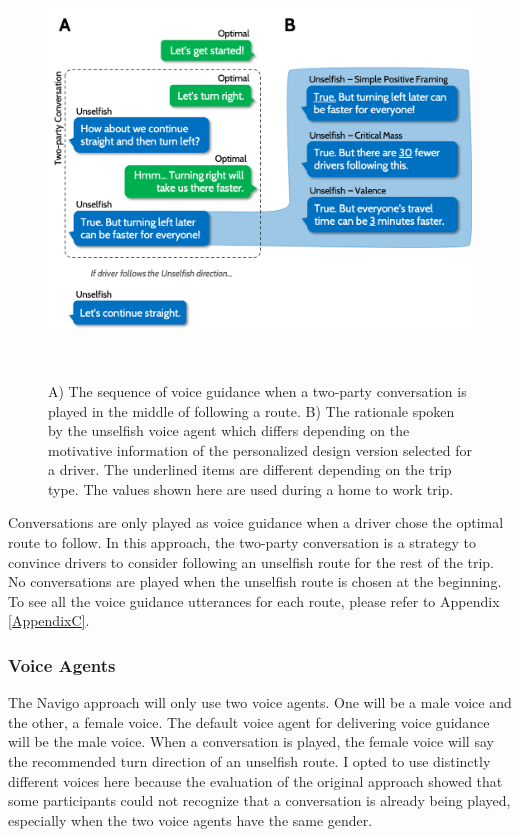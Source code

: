 \begin{figure}[h]
\centering
  \includegraphics[scale=.75]{figures/s4-twopartyconvo.png}
  \caption{A) The sequence of voice guidance when a two-party conversation is played in the middle of following a route. B) The rationale spoken by the unselfish voice agent which differs depending on the motivative information of the personalized design version selected for a driver. The underlined items are different depending on the trip type. The values shown here are used during a home to work trip.}~\label{fig:s4-twopartyconvo}
\end{figure}

Conversations are only played as voice guidance when a driver chose the optimal route to follow. In this approach, the two-party conversation is a strategy to convince drivers to consider following an unselfish route for the rest of the trip. No conversations are played when the unselfish route is chosen at the beginning. To see all the voice guidance utterances for each route, please refer to Appendix \ref{AppendixC}.

\subsubsection{Voice Agents}
The Navigo approach will only use two voice agents. One will be a male voice and the other, a female voice. The default voice agent for delivering voice guidance will be the male voice. When a conversation is played, the female voice will say the recommended turn direction of an unselfish route. I opted to use distinctly different voices here because the evaluation of the original approach showed that some participants could not recognize that a conversation is already being played, especially when the two voice agents have the same gender. 

